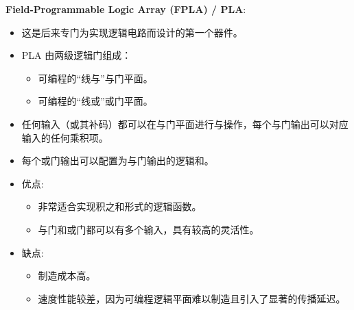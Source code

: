 \documentclass[
  ignorenonframetext,
  chinese,
]{beamer}
\providecommand{\tightlist}{%
  \setlength{\itemsep}{0pt}\setlength{\parskip}{0pt}}
\begin{document}
\begin{frame}
\begin{block}{\textbf{Field-Programmable Logic Array (FPLA) / PLA}:}
\label{field-programmable-logic-array-fpla-pla}
\begin{itemize}
\tightlist
\item
  这是后来专门为实现逻辑电路而设计的第一个器件。
\item
  PLA 由两级逻辑门组成：

  \begin{itemize}
  \tightlist
  \item
    可编程的``线与''与门平面。
  \item
    可编程的``线或''或门平面。
  \end{itemize}
\item
  任何输入（或其补码）都可以在与门平面进行与操作，每个与门输出可以对应输入的任何乘积项。
\item
  每个或门输出可以配置为与门输出的逻辑和。
\item
  优点:

  \begin{itemize}
  \tightlist
  \item
    非常适合实现积之和形式的逻辑函数。
  \item
    与门和或门都可以有多个输入，具有较高的灵活性。
  \end{itemize}
\item
  缺点:

  \begin{itemize}
  \tightlist
  \item
    制造成本高。
  \item
    速度性能较差，因为可编程逻辑平面难以制造且引入了显著的传播延迟。
\end{itemize}
\end{itemize}
\end{block}
\end{frame}
\end{document}
